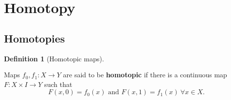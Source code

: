 \documentclass[10pt,]{book}
\newcommand{\terminology}[1]{\textbf{#1}}
\theoremstyle{plain}
\theoremstyle{definition}
\newtheorem{definition}[theorem]{Definition}
\numberwithin{equation}{section}
\begin{document}
\section[Homotopy]{Homotopy}\label{section-2}
\typeout{************************************************}
\typeout{************************************************}
\subsection[Homotopies]{Homotopies}\label{subsection-1}
\begin{definition}[Homotopic maps]\label{definition-1}

              Maps \(f_0,f_1\colon X \to Y\) are said to be \terminology{homotopic} if there is a
              continuous map \(F\colon X\times I \to Y\) such that
              \[
                F(x,0) = f_0(x)\text{ and }F(x,1) = f_1(x)\ \forall x\in X.
              \]\end{definition}
\end{document}
